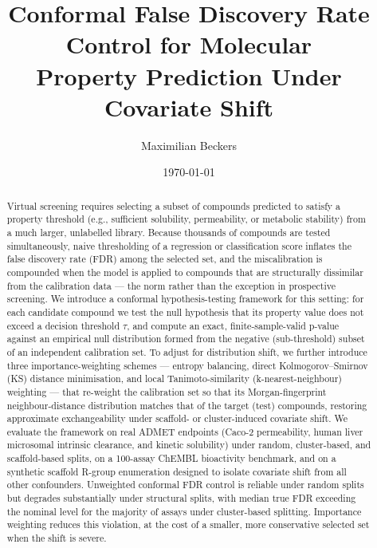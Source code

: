 \documentclass[11pt]{article}
\title{Conformal False Discovery Rate Control for Molecular\\
Property Prediction Under Covariate Shift}
\author{Maximilian Beckers}
\date{\today}
\begin{document}
\sloppy

\maketitle

\begin{abstract}
Virtual screening requires selecting a subset of compounds predicted
to satisfy a property threshold (e.g., sufficient solubility, permeability, or
metabolic stability) from a much larger,  unlabelled library.  Because thousands of
compounds are tested simultaneously, naive thresholding of a regression or
classification score inflates the false discovery rate (FDR) among the selected
set, and the miscalibration is compounded when the model is applied to compounds
that are structurally dissimilar from the calibration data --- the norm rather than
the exception in prospective screening. We introduce a conformal hypothesis-testing
framework for this setting: for each candidate compound we test the null hypothesis
that its property value does not exceed a decision threshold $\tau$,  and compute an
exact,  finite-sample-valid p-value against an empirical null distribution formed
from the negative (sub-threshold) subset of an independent calibration set. To adjust for distribution shift, we further introduce three importance-weighting schemes ---
entropy balancing, direct Kolmogorov--Smirnov (KS) distance minimisation, and local
Tanimoto-similarity (k-nearest-neighbour) weighting --- that re-weight the
calibration set so that its Morgan-fingerprint neighbour-distance distribution
matches that of the target (test) compounds, restoring approximate exchangeability
under scaffold- or cluster-induced covariate shift. We evaluate the framework on real ADMET endpoints (Caco-2 permeability, human liver microsomal intrinsic
clearance, and kinetic solubility) under random, cluster-based, and scaffold-based
splits, on a 100-assay ChEMBL bioactivity benchmark, and on a synthetic scaffold
R-group enumeration designed to isolate covariate shift from all other confounders.
Unweighted conformal FDR control is reliable under random splits but degrades
substantially under structural splits, with median true FDR exceeding the nominal
level for the majority of assays under cluster-based splitting. Importance
weighting reduces this violation, at the cost of a smaller, more conservative
selected set when the shift is severe.
\end{abstract}

\end{document}
